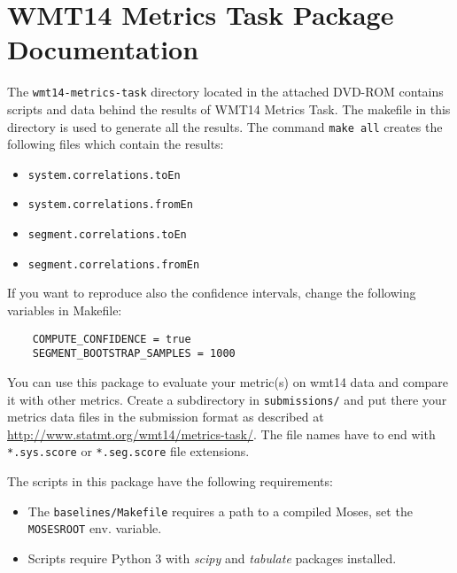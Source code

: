 \appendix
\chapter{WMT14 Metrics Task Package Documentation}
\label{metrics-documentation}

\noindent
The \texttt{wmt14-metrics-task} directory located in the attached DVD-ROM
contains scripts and data behind the results of WMT14 Metrics Task. The
makefile in this directory is used to generate all the results. The command
\texttt{make all} creates the following files which contain the results: 

\begin{itemize}
  \item \texttt{system.correlations.toEn}
  \item \texttt{system.correlations.fromEn}
  \item \texttt{segment.correlations.toEn}
  \item \texttt{segment.correlations.fromEn}
\end{itemize}

\noindent
If you want to reproduce also the confidence intervals, change the following
variables in Makefile:

\begin{verbatim}
    COMPUTE_CONFIDENCE = true
    SEGMENT_BOOTSTRAP_SAMPLES = 1000
\end{verbatim}

\noindent
You can use this package to evaluate your metric(s) on wmt14 data and compare
it with other metrics. Create a subdirectory in \texttt{submissions/} and put
there your metrics data files in the submission format as described at
\url{http://www.statmt.org/wmt14/metrics-task/}.  The file names have to end
with \texttt{*.sys.score} or \texttt{*.seg.score} file extensions.

\vspace{0.7cm}
\noindent
The scripts in this package have the following requirements:
 
\begin{itemize}
  \item The \texttt{baselines/Makefile} requires a path to a compiled Moses, set
    the \texttt{MOSESROOT} env. variable.
  \item Scripts require Python 3 with \textit{scipy} and \textit{tabulate} packages installed.
\end{itemize}


